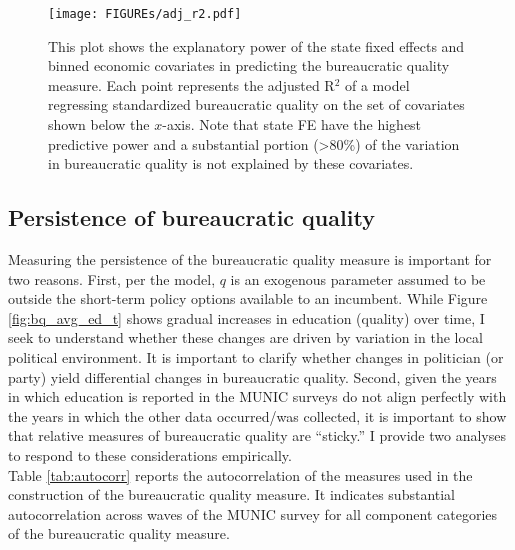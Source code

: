 \documentclass[11pt,english]{article}
\begin{document}
\begin{figure}
\centering
\texttt{[image: FIGUREs/adj\_r2.pdf]}
\caption{This plot shows the explanatory power of the state fixed effects and binned economic covariates in predicting the bureaucratic quality measure. Each point represents the adjusted R$^2$ of a model regressing standardized bureaucratic quality on the set of covariates shown below the $x$-axis. Note that state FE have the highest predictive power and a substantial portion (>80\%) of the variation in bureaucratic quality is not explained by these covariates. }\label{fig:r2}
\end{figure}

\subsection{Persistence of bureaucratic quality}
Measuring the persistence of the bureaucratic quality measure is important for two reasons. First, per the model, $q$ is an exogenous parameter assumed to be outside the short-term policy options available to an incumbent. While Figure \ref{fig:bq_avg_ed_t} shows gradual increases in education (quality) over time, I seek to understand whether these changes are driven by variation in the local political environment. It is important to clarify whether changes in politician (or party) yield differential changes in bureaucratic quality. Second, given the years in which education is reported in the MUNIC surveys do not align perfectly with the years in which the other data occurred/was collected, it is important to show that relative measures of bureaucratic quality are ``sticky.'' I provide two analyses to respond to these considerations empirically. \\

Table \ref{tab:autocorr} reports the autocorrelation of the measures used in the construction of the bureaucratic quality measure. It indicates substantial autocorrelation across waves of the MUNIC survey for all component categories of the bureaucratic quality measure.\\
\end{document}
